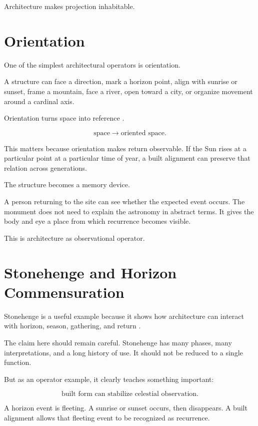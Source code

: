 \documentclass[11pt]{book}
\begin{document}
Architecture makes projection inhabitable.

\section{Orientation}

One of the simplest architectural operators is orientation.

A structure can face a direction, mark a horizon point, align with sunrise or sunset, frame a mountain, face a river, open toward a city, or organize movement around a cardinal axis.

Orientation turns space into reference \cite{Ruggles1999AstronomyPrehistoricBritain,Ruggles2005AncientAstronomy,Krupp1994EchoesAncientSkies}.

\[
\text{space}
\rightarrow
\text{oriented space}.
\]

This matters because orientation makes return observable. If the Sun rises at a particular point at a particular time of year, a built alignment can preserve that relation across generations.

The structure becomes a memory device.

A person returning to the site can see whether the expected event occurs. The monument does not need to explain the astronomy in abstract terms. It gives the body and eye a place from which recurrence becomes visible.

This is architecture as observational operator.

\section{Stonehenge and Horizon Commensuration}

Stonehenge is a useful example because it shows how architecture can interact with horizon, season, gathering, and return \cite{Ruggles1999AstronomyPrehistoricBritain,Ruggles2005AncientAstronomy,Krupp1994EchoesAncientSkies}.

The claim here should remain careful. Stonehenge has many phases, many interpretations, and a long history of use. It should not be reduced to a single function.

But as an operator example, it clearly teaches something important:

\[
\text{built form can stabilize celestial observation}.
\]

A horizon event is fleeting. A sunrise or sunset occurs, then disappears. A built alignment allows that fleeting event to be recognized as recurrence.
\end{document}
